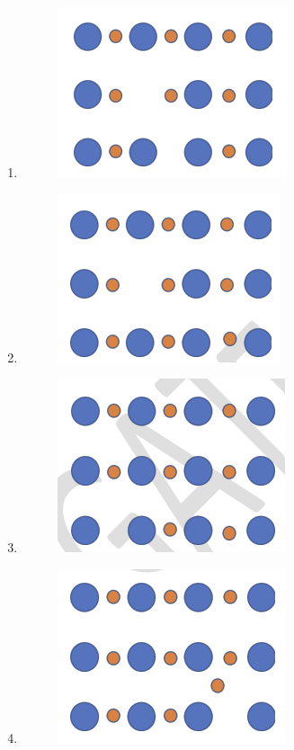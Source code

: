 \documentclass[12pt]{article}
\begin{document}
\begin{enumerate}
\begin{enumerate}
\item \begin{figure}[H]
    \centering
    \includegraphics[width=0.5\columnwidth]{figs/ass5_c_q59_a.png}
    \caption{}
    \label{fig:placeholder}
\end{figure}
\item \begin{figure}[H]
    \centering
    \includegraphics[width=0.5\columnwidth]{figs/ass5_c_q59_b.png}
    \caption{}
    \label{fig:placeholder}
\end{figure}
\item \begin{figure}[H]
    \centering
    \includegraphics[width=0.5\columnwidth]{figs/ass5_c_q59_c.png}
    \caption{}
    \label{fig:placeholder}
\end{figure}
\item \begin{figure}[H]
    \centering
    \includegraphics[width=0.5\columnwidth]{figs/ass5_c_q59_d.png}
    \caption{}
    \label{fig:placeholder}
\end{figure}
\end{enumerate}


\end{enumerate}
\end{document}
